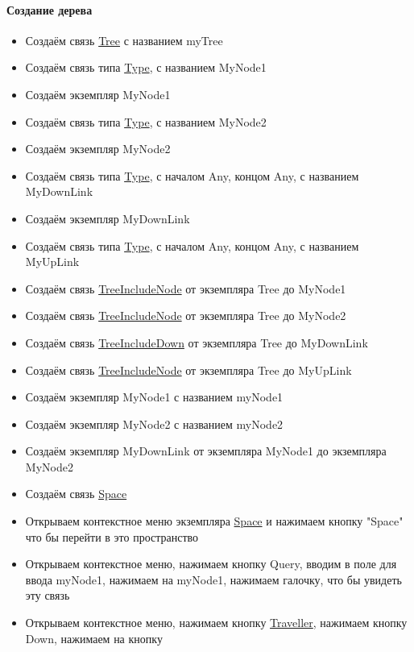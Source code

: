 \documentclass{article}
\begin{document}
\paragraph{Создание дерева}
\begin{itemize}
  \item Создаём связь \hyperlink{Tree}{Tree} с названием myTree
  \item Создаём связь типа \hyperlink{Type.Def}{Type}, с названием MyNode1
  \item Создаём экземпляр MyNode1
  \item Создаём связь типа \hyperlink{Type.Def}{Type}, с названием MyNode2
  \item Создаём экземпляр MyNode2
  \item Создаём связь типа \hyperlink{Type.Def}{Type}, с началом Any, концом
        Any, с названием MyDownLink
  \item Создаём экземпляр MyDownLink
  \item Создаём связь типа \hyperlink{Type.Def}{Type}, с началом Any, концом
        Any, с названием MyUpLink
  \item Создаём связь \hyperlink{TreeIncludeNode.Def}{TreeIncludeNode} от
        экземпляра Tree до MyNode1
  \item Создаём связь \hyperlink{TreeIncludeNode.Def}{TreeIncludeNode} от
        экземпляра Tree до MyNode2
  \item Создаём связь \hyperlink{TreeIncludeDown.Def}{TreeIncludeDown} от
        экземпляра Tree до MyDownLink
  \item Создаём связь \hyperlink{TreeIncludeNode.Def}{TreeIncludeNode} от
        экземпляра Tree до MyUpLink
  \item Создаём экземпляр MyNode1 с названием myNode1
  \item Создаём экземпляр MyNode2 с названием myNode2
  \item Создаём экземпляр MyDownLink от экземпляра MyNode1 до экземпляра
        MyNode2
  \item Создаём связь \hyperlink{Space.Def}{Space}
  \item Открываем контекстное меню экземпляра \hyperlink{Space.Def}{Space} и
        нажимаем кнопку "Space" что бы перейти в это пространство
  \item Открываем контекстное меню, нажимаем кнопку Query, вводим в поле для
        ввода myNode1, нажимаем на myNode1, нажимаем галочку, что бы увидеть эту связь
  \item Открываем контекстное меню, нажимаем кнопку
        \hyperlink{Traveller.Def}{Traveller}, нажимаем кнопку Down, нажимаем на кнопку

\end{itemize}
\end{document}
